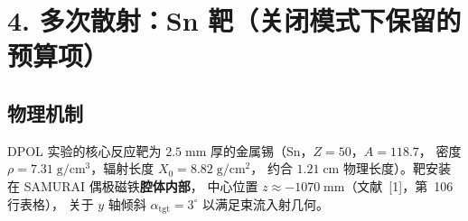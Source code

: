 %
%
%
%

\providecommand{\StatusReport}{文献~[1]}

\section{4. 多次散射：Sn 靶（关闭模式下保留的预算项）}
\label{sec:budget-sn-ms}

\subsection{物理机制}
\label{sec:budget-sn-ms-mechanism}

DPOL 实验的核心反应靶为 $2.5\;\mathrm{mm}$ 厚的金属锡（Sn，$Z=50$，$A=118.7$，
密度 $\rho = 7.31\;\mathrm{g/cm^3}$，辐射长度 $X_0 = 8.82\;\mathrm{g/cm^2}$，
约合 $1.21\;\mathrm{cm}$ 物理长度）。靶安装在 SAMURAI 偶极磁铁\textbf{腔体内部}，
中心位置 $z \approx -1070\;\mathrm{mm}$（\StatusReport，第~106 行表格），
关于 $y$ 轴倾斜 $\alpha_\mathrm{tgt} = 3^\circ$ 以满足束流入射几何。

